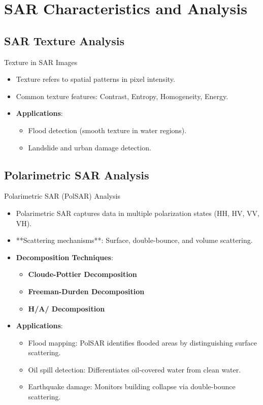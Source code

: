 \documentclass[10pt]{beamer}
\begin{document}
\section{SAR Characteristics and Analysis}
\subsection{SAR Texture Analysis}
\begin{frame}{Texture in SAR Images}
    \begin{itemize}
        \item Texture refers to spatial patterns in pixel intensity.
        \item Common texture features: Contrast, Entropy, Homogeneity, Energy.
        \item \textbf{Applications}: 
        \begin{itemize}
            \item Flood detection (smooth texture in water regions).
            \item Landslide and urban damage detection.
        \end{itemize}
    \end{itemize}
\end{frame}

\subsection{Polarimetric SAR Analysis}
\begin{frame}{Polarimetric SAR (PolSAR) Analysis}
    \begin{itemize}
        \item Polarimetric SAR captures data in multiple polarization states (HH, HV, VV, VH).
        \item **Scattering mechanisms**: Surface, double-bounce, and volume scattering.
        \item \textbf{Decomposition Techniques}:
        \begin{itemize}
            \item \textbf{Cloude-Pottier Decomposition}
            \item \textbf{Freeman-Durden Decomposition}
            \item \textbf{H/A/ Decomposition}
        \end{itemize}
        \item \textbf{Applications}:
        \begin{itemize}
            \item Flood mapping: PolSAR identifies flooded areas by distinguishing surface scattering.
            \item Oil spill detection: Differentiates oil-covered water from clean water.
            \item Earthquake damage: Monitors building collapse via double-bounce scattering.
        \end{itemize}
    \end{itemize}
\end{frame}
\end{document}
